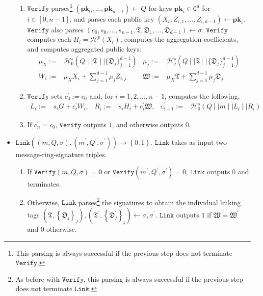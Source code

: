 \documentclass{llncs}
\newcommand{\G}{\texttt{G}}
\newcommand{\Hp}{\mathcal{H}^p}
\newcommand{\Hs}{\mathcal{H}^s}
\begin{document}
\begin{definition}[$d$-CLSAG]
\begin{itemize}
\begin{enumerate}
\item $\texttt{Verify}$ parses\footnote{This parsing is always successful if the previous step does not terminate $\texttt{Verify}$.} $(\textbf{pk}_0, \ldots, \textbf{pk}_{n-1}) \leftarrow Q$ for keys $\textbf{pk}_i \in \G^d$ for $i \in [0,n-1]$, and parses each public key $(X_i, Z_{i, 1}, \ldots, Z_{i, d-1}) \leftarrow \textbf{pk}_i$.  $\texttt{Verify}$ also parses $(c_0, s_0, \ldots, s_{n-1}, \mathfrak{T}, \mathfrak{D}_1, \ldots, \mathfrak{D}_{d - 1}) \leftarrow \sigma$. $\texttt{Verify}$ computes each $H_i = \Hp(X_i)$, computes the aggregation coefficients, and computes aggregated public keys:
\begin{align*}
\mu_X := & \Hs_0(Q \mid \mid \mathfrak{T} \mid \mid \{\mathfrak{D}_j\}_{j=1}^{d-1}) & \mu_j := & \Hs_j(Q \mid \mid \mathfrak{T} \mid \mid \{\mathfrak{D}_j\}_{j=1}^{d-1})\\
W_i :=& \mu_X X_i + \sum_{j=1}^{d-1} \mu_j Z_{i,j} & \mathfrak{W} :=& \mu_X \mathfrak{T} + \sum_{j=1}^{d-1} \mu_j \mathfrak{D}_j
\end{align*}

\item $\texttt{Verify}$ sets $c_0^\prime := c_0$ and, for $i=1, 2, \ldots, n-1$, computes the following.
\begin{align*}
L_i :=& s_i G + c_i^\prime W_i, &
R_i :=& s_i H_i + c_i^\prime\mathfrak{W}, &
c_{i+1}^\prime :=& \Hs_0\left(Q \mid \mid m \mid \mid L_i \mid \mid R_i\right)
\end{align*}
\item If $c_{n}^\prime = c_0$, $\texttt{Verify}$ outputs $1$, and otherwise outputs $0$.
\end{enumerate}

\item $\texttt{Link}\left((m, Q, \sigma), (m^\prime, Q^\prime, \sigma^\prime)\right) \to \left\{0,1\right\}$. $\texttt{Link}$ takes as input two message-ring-signature triples.
\begin{enumerate}
\item If $\texttt{Verify}(m, Q, \sigma) = 0$ or $\texttt{Verify}(m^\prime, Q^\prime, \sigma^\prime) = 0$, $\texttt{Link}$ outputs $0$ and terminates.

\item Otherwise, $\texttt{Link}$ parses\footnote{As before with $\texttt{Verify}$, this parsing is always successful if the previous step does not terminate $\texttt{Link}$.} the signatures to obtain the individual linking tags $(\mathfrak{T}, \left\{\mathfrak{D}_j\right\}_j), (\mathfrak{T}^\prime, \left\{\mathfrak{D}^\prime_j\right\}_j) \leftarrow \sigma, \sigma^\prime$. $\texttt{Link}$ outputs $1$ if $\mathfrak{W} = \mathfrak{W}^\prime$ and $0$ otherwise.
\end{enumerate}
\end{itemize}
\end{definition}
\end{document}

